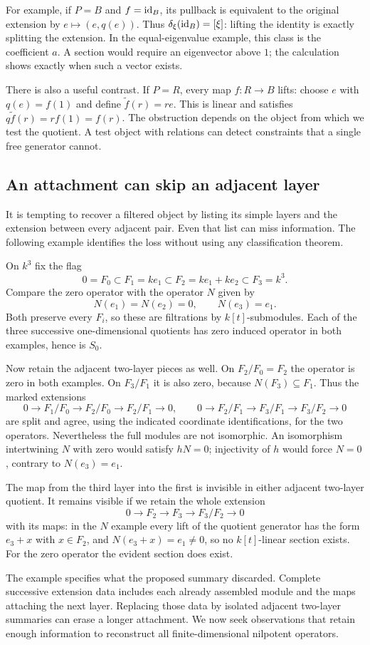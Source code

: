 For example, if $P=B$ and $f=\mathrm{id}_B$, its pullback is equivalent to
the original extension by $e\mapsto(e,q(e))$. Thus
$\delta_\xi(\mathrm{id}_B)=[\xi]$: lifting the identity is exactly splitting
the extension. In the equal-eigenvalue example, this class is the
coefficient $a$. A section would require an eigenvector above $1$;
the calculation shows exactly when such a vector exists.

There is also a useful contrast. If $P=R$, every map $f:R\to B$ lifts:
choose $e$ with $q(e)=f(1)$ and define $\widetilde f(r)=re$. This is
linear and satisfies $q\widetilde f(r)=r f(1)=f(r)$. The obstruction
depends on the object from which we test the quotient. A test object
with relations can detect constraints that a single free generator
cannot.

\subsection{An attachment can skip an adjacent layer}\label{x:skip-layer}

It is tempting to recover a filtered object by listing its simple
layers and the extension between every adjacent pair. Even that list
can miss information. The following example identifies the loss without
using any classification theorem.

On $k^3$ fix the flag
\[
0=F_0\subset F_1=ke_1\subset F_2=ke_1+ke_2\subset F_3=k^3.
\]
Compare the zero operator with the operator $N$ given by
\[
N(e_1)=N(e_2)=0,\qquad N(e_3)=e_1.
\]
Both preserve every $F_i$, so these are filtrations by $k[t]$-submodules.
Each of the three successive one-dimensional quotients has zero induced
operator in both examples, hence is $S_0$.

Now retain the adjacent two-layer pieces as well. On $F_2/F_0=F_2$
the operator is zero in both examples. On $F_3/F_1$ it is also zero,
because $N(F_3)\subseteq F_1$. Thus the marked extensions
\[
0\to F_1/F_0\to F_2/F_0\to F_2/F_1\to0,
\qquad
0\to F_2/F_1\to F_3/F_1\to F_3/F_2\to0
\]
are split and agree, using the indicated coordinate identifications,
for the two operators. Nevertheless the full modules are not
isomorphic. An isomorphism intertwining $N$ with zero would satisfy
$hN=0$; injectivity of $h$ would force $N=0$, contrary to $N(e_3)=e_1$.

The map from the third layer into the first is invisible in either
adjacent two-layer quotient. It remains visible if we retain the whole
extension
\[
0\longrightarrow F_2\longrightarrow F_3\longrightarrow F_3/F_2
\longrightarrow0
\]
with its maps: in the $N$ example every lift of the quotient generator
has the form $e_3+x$ with $x\in F_2$, and $N(e_3+x)=e_1\ne0$,
so no $k[t]$-linear section exists. For the zero operator the evident
section does exist.

The example specifies what the proposed summary discarded. Complete
successive extension data includes each already assembled module and
the maps attaching the next layer. Replacing those data by isolated
adjacent two-layer summaries can erase a longer attachment. We now
seek observations that retain enough information to reconstruct all
finite-dimensional nilpotent operators.
